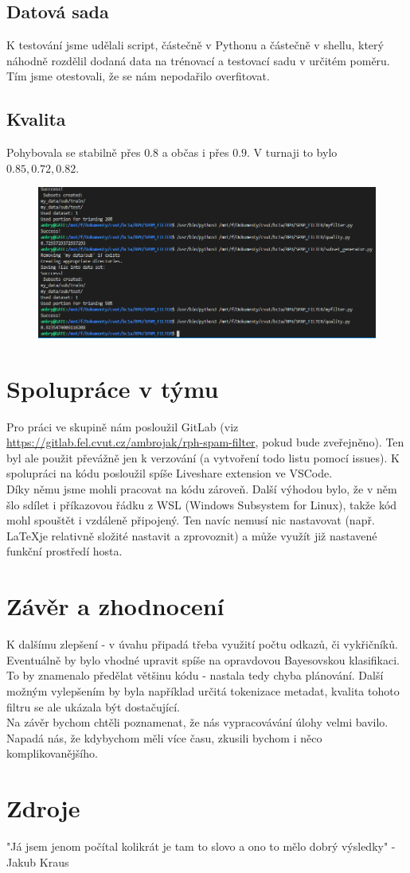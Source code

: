 \documentclass[12pt]{article}
\begin{document}
\subsection{Datová sada}
K testování jsme udělali script, částečně v Pythonu a částečně v shellu, který náhodně rozdělil dodaná data na trénovací a testovací sadu v určitém poměru. Tím jsme otestovali, že se nám nepodařilo overfitovat.
\subsection{Kvalita}
Pohybovala se stabilně přes $0.8$ a občas i přes $0.9$. V turnaji to bylo $0.85, 0.72, 0.82$.
\begin{figure}[htp]
\includegraphics[width=1\textwidth]{uspesnost.png}
\end{figure}
\section{Spolupráce v týmu}
Pro práci ve skupině nám posloužil GitLab (viz \url{https://gitlab.fel.cvut.cz/ambrojak/rph-spam-filter}, pokud bude zveřejněno). Ten byl ale použit převážně jen k verzování (a vytvoření todo listu pomocí issues). K spolupráci na kódu posloužil spíše Liveshare extension ve VSCode.\\
Díky němu jsme mohli pracovat na kódu zároveň. Další výhodou bylo, že v něm šlo sdílet i příkazovou řádku z WSL (Windows Subsystem for Linux), takže kód mohl spouštět i vzdáleně připojený. Ten navíc nemusí nic nastavovat (např. \LaTeX je relativně složité nastavit a zprovoznit) a může využít již nastavené funkční prostředí hosta.
\section{Závěr a zhodnocení}
K dalšímu zlepšení - v úvahu připadá třeba využití počtu odkazů, či vykřičníků. Eventuálně by bylo vhodné upravit spíše na opravdovou Bayesovskou klasifikaci. To by znamenalo předělat většinu kódu - nastala tedy chyba plánování. Další možným vylepšením by byla například určitá tokenizace metadat, kvalita tohoto filtru se ale ukázala být dostačující.\\
Na závěr bychom chtěli poznamenat, že nás vypracovávání úlohy velmi bavilo. Napadá nás, že kdybychom měli více času, zkusili bychom i něco komplikovanějšího.
\section{Zdroje}
"Já jsem jenom počítal kolikrát je tam to slovo a ono to mělo dobrý výsledky" - Jakub Kraus
\end{document}
